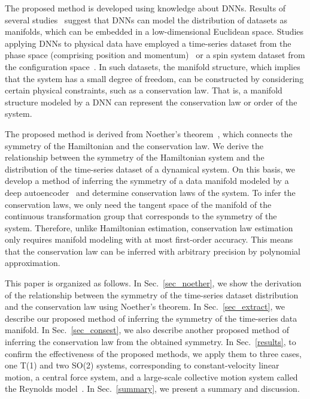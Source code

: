 \documentclass[preprint,
bibnotes,
 amsmath,amssymb,
 aps,
]{revtex4-1}
\begin{document}
The proposed method is developed using knowledge about DNNs. Results of several studies~\cite{Irie_1990,Hinton_Reducing_2006,brahma2016deep,basri2016efficient,Rifai_The_2011,mototakearob} suggest that DNNs can model the distribution of datasets as manifolds, which can be embedded in a low-dimensional Euclidean space. 
Studies applying DNNs to physical data have employed a time-series dataset from the phase space (comprising position and momentum)~\cite{yeo2017model,morton2018deep,rudy2018deep,takeishi2017learning,lusch2018deep} or a spin system dataset from the configuration space~\cite{ohtsuki2016deep,ohtsuki2017deep,broecker2017machine,ch2017machine,carrasquilla2017machine,tanaka2017detection,saito2017machine,van2017learning,zhang2018machine}. 
In such datasets, the manifold structure, which implies that the system has a small degree of freedom, can be constructed by considering certain physical constraints, such as a conservation law. 
That is, a manifold structure modeled by a DNN can represent the conservation law or order of the system.\par
The proposed method is derived from Noether's theorem~\cite{noether1918nachr}, which connects the symmetry of the Hamiltonian and the conservation law. 
We derive the relationship between the symmetry of the Hamiltonian system and the distribution of the time-series dataset of a dynamical system. 
On this basis, we develop a method of inferring the symmetry of a data manifold modeled by a deep autoencoder~\cite{Hinton_Reducing_2006} and determine conservation laws of the system. 
To infer the conservation laws, we only need the tangent space of the manifold of the continuous transformation group that corresponds to the symmetry of the system. 
Therefore, unlike Hamiltonian estimation, conservation law estimation only requires manifold modeling with at most first-order accuracy. This means that the conservation law can be inferred with arbitrary precision by polynomial approximation.
\par
This paper is organized as follows. 
In Sec.~\ref{sec_noether}, we show the derivation of the relationship between the symmetry of the time-series dataset distribution and the conservation law using Noether's theorem. 
In Sec.~\ref{sec_extract}, we describe our proposed method of inferring the symmetry of the time-series data manifold. 
In Sec.~\ref{sec_consest}, we also describe another proposed method of inferring the conservation law from the obtained symmetry. 
In Sec.~\ref{results}, to confirm the effectiveness of the proposed methods, we apply them to three cases, one T(1) and two SO(2) systems, corresponding to constant-velocity linear motion, a central force system, and a large-scale collective motion system called the Reynolds model~\cite{reynolds1987flocks}.  
In Sec.~\ref{summary}, we present a summary and discussion.
\end{document}
